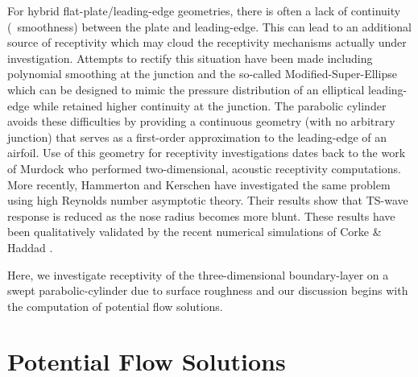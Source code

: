 For hybrid flat-plate/leading-edge geometries, there is often a lack of
continuity (\ie\ smoothness) between the plate and leading-edge.  This can
lead to an additional source of receptivity \cite{GoHu:87} which may cloud the
receptivity mechanisms actually under investigation.  Attempts to rectify this
situation have been made \cite{LiReSa:92} including polynomial smoothing at
the junction and the so-called Modified-Super-Ellipse which can be designed to
mimic the pressure distribution of an elliptical leading-edge while retained
higher continuity at the junction.  The parabolic cylinder avoids these
difficulties by providing a continuous geometry (with no arbitrary junction)
that serves as a first-order approximation \cite{vanDyke:64} to the
leading-edge of an airfoil.  Use of this geometry for receptivity
investigations dates back to the work of Murdock \cite{Murdock:81} who
performed two-dimensional, acoustic receptivity computations.  More recently,
Hammerton and Kerschen \cite{HaKe:96} have investigated the same problem using
high Reynolds number asymptotic theory.  Their results show that TS-wave
response is reduced as the nose radius becomes more blunt.  These results have
been qualitatively validated by the recent numerical simulations of Corke \&
Haddad \cite{CoHa:95}.

Here, we investigate receptivity of the three-dimensional boundary-layer on a
swept parabolic-cylinder due to surface roughness and our discussion begins
with the computation of potential flow solutions.

\section{Potential Flow Solutions \label{s:pcylpot} }

